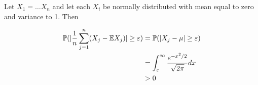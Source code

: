 
Let $ X_{1} = \dots X_{n} $ and let each $ X_{i} $ be normally distributed with mean equal to zero
and variance to 1. Then 

\begin{align*}
    \mathbb P( | \frac{1}{n} \sum_{j=1}^{n} (X_{j} - \mathbb{E} X_{j} ) |  \geq \varepsilon) &= \mathbb P( |X_{j}
    - \mu| \geq \varepsilon) \\
										      &= \int_{\varepsilon}^{\infty}
										      \frac{e^{-x^2/2}}{\sqrt{2\pi}}dx\\
										      &> 0
\end{align*}
